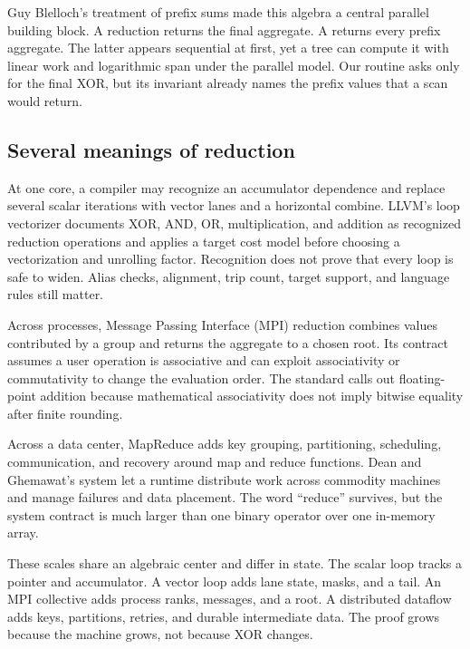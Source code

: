Guy Blelloch's treatment of prefix sums made this algebra a central parallel
building block. A reduction returns the final aggregate. A 
returns every prefix aggregate. The latter appears sequential at first, yet a
tree can compute it with linear work and logarithmic span under the parallel
model. \autocite{blelloch1990prefix} Our routine asks only for the final XOR,
but its invariant already names the prefix values that a scan would return.

\subsection{Several meanings of reduction}

At one core, a compiler may recognize an accumulator dependence and replace
several scalar iterations with vector lanes and a horizontal combine. LLVM's
loop vectorizer documents XOR, AND, OR, multiplication, and addition as
recognized reduction operations and applies a target cost model before
choosing a vectorization and unrolling factor. \autocite{llvm2026vectorizer}
Recognition does not prove that every loop is safe to widen. Alias checks,
alignment, trip count, target support, and language rules still matter.

Across processes, Message Passing Interface (MPI) reduction combines values
contributed by a group and returns the aggregate to a chosen root. Its
contract assumes a user operation
is associative and can exploit associativity or commutativity to change the
evaluation order. The standard calls out floating-point addition because
mathematical associativity does not imply bitwise equality after finite
rounding. \autocite{mpi2015reduce}

Across a data center, MapReduce adds key grouping, partitioning, scheduling,
communication, and recovery around map and reduce functions. Dean and
Ghemawat's system let a runtime distribute work across commodity machines and
manage failures and data placement. \autocite{deanghemawat2004mapreduce} The
word ``reduce'' survives, but the system contract is much larger than one
binary operator over one in-memory array.

These scales share an algebraic center and differ in state. The scalar loop
tracks a pointer and accumulator. A vector loop adds lane state, masks, and a
tail. An MPI collective adds process ranks, messages, and a root. A distributed
dataflow adds keys, partitions, retries, and durable intermediate data. The
proof grows because the machine grows, not because XOR changes.

